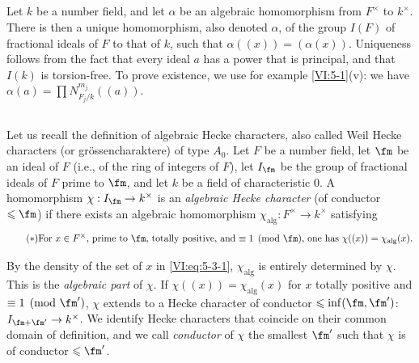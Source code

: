 \documentclass[oneside]{book}
\begin{document}
\subsection{}\label{VI:5-2}

Let $k$ be a number field, and let $\alpha$ be an algebraic homomorphism 
from $F^\times$ to $k^\times$. There is then a unique 
homomorphism, also denoted $\alpha$, of the group $I(F)$ 
of fractional ideals of $F$ to that of $k$, such that $\alpha((x))=(\alpha(x))$. 
Uniqueness follows from the fact that every ideal $a$ has a power that is 
principal, and that $I(k)$ is torsion-free. To prove 
existence, we use for example \ref{VI:5-1}(v): we have 
$\alpha(a) = \prod N_{F_j/k}^{m_j}((a))$. 





\subsection{}\label{VI:5-3}

Let us recall the definition of algebraic Hecke characters, also called 
Weil Hecke characters (or gr\"ossencharaktere) of type $A_0$. Let $F$ be 
a number field, let $\fm$ be an ideal of $F$ (i.e., of the ring of integers of 
$F$), let $I_\fm$ be the group of fractional ideals of $F$ prime to $\fm$, 
and let $k$ be a field of characteristic $0$. A homomorphism 
$\chi:I_\fm \to k^\times$ is an \emph{algebraic Hecke character} (of 
conductor $\leqslant \fm$) if there exists an algebraic homomorphism 
$\chi_\text{alg}:F^\times \to k^\times$ satisfying 
\begin{equation*}\tag{$*$}\label{VI:eq:5-3-1}
\text{For $x\in F^\times$, prime to $\fm$, totally positive, and 
$\equiv 1\pmod\fm$, one has $\chi((x))=\chi_\text{alg}(x)$.}
\end{equation*}

By the density of the set of $x$ in \eqref{VI:eq:5-3-1}, $\chi_\text{alg}$ 
is entirely determined by $\chi$. This is the \emph{algebraic part} 
of $\chi$. If $\chi((x))=\chi_\text{alg}(x)$ for $x$ totally positive and 
$\equiv 1\pmod{\fm'}$, $\chi$ extends to a Hecke character of 
conductor $\leqslant \inf(\fm,\fm')$: $I_{\fm+\fm'}\to k^\times$. We 
identify Hecke characters that coincide on their common domain of 
definition, and we call \emph{conductor} of $\chi$ the smallest $\fm'$ 
such that $\chi$ is of conductor $\leqslant \fm'$. 
\end{document}
